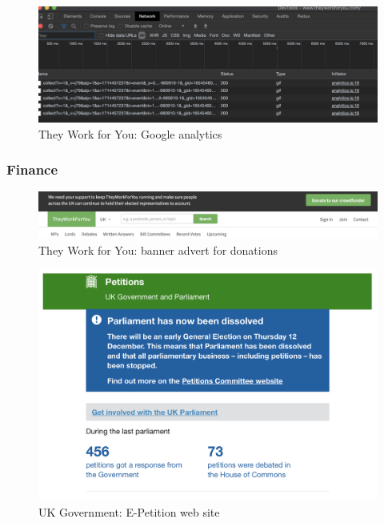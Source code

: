 \documentclass{article}
\begin{document}
			\begin{figure}[h]
				\centering
				\includegraphics[scale=0.4]{images/they-work-for-you-challenges-google-analytics}
				\caption{They Work for You: Google analytics}
				\label{fig:they-work-for-you-challenges-google-analytics}
			\end{figure}
			
        	\subsubsection*{Finance}
        	    

			\begin{figure}[h]
				\centering
				\includegraphics[scale=0.4]{images/they-work-for-you-challenges-finance}
				\caption{They Work for You: banner advert for donations}
				\label{fig:they-work-for-you-challenges-finance}
			\end{figure}
			
			\begin{figure}[h]
				\centering
				\includegraphics[scale=0.4]{images/e-petition-site}
				\caption{UK Government: E-Petition web site}
				\label{fig:e-petition-site}
			\end{figure}
						
\end{document}
